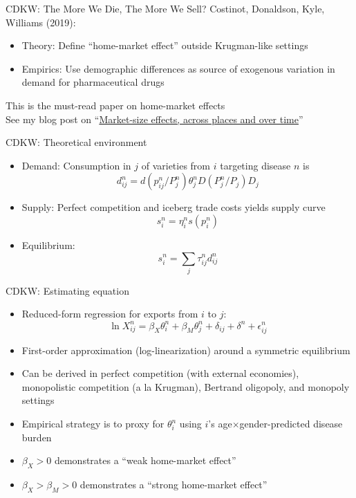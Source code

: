 \documentclass[10pt,notes=hide]{beamer}
\begin{document}
\begin{frame}{CDKW: The More We Die, The More We Sell?}
Costinot, Donaldson, Kyle, Williams (2019):
\begin{itemize}
	\item Theory: Define ``home-market effect'' outside Krugman-like settings
	\item Empirics: Use demographic differences as source of exogenous variation in demand for pharmaceutical drugs
\end{itemize}
This is the must-read paper on home-market effects\\
\vspace{5mm}
\footnotesize{See my blog post on ``\href{https://tradediversion.net/2019/09/23/market-size-effects-across-places-and-over-time/}{Market-size effects, across places and over time}''}
\end{frame}
\begin{frame}{CDKW: Theoretical environment}
\begin{itemize}
	\item Demand: Consumption in $j$ of varieties from $i$ targeting disease $n$ is
	\begin{equation*}d_{ij}^n = d(p_{ij}^n/P_j^n) \theta_j^n D(P_j^n/P_j) D_j \end{equation*}
	\item Supply: Perfect competition and iceberg trade costs yields supply curve
	\begin{equation*} s_i^n = \eta_i^n s(p_i^n)\end{equation*}
	\item Equilibrium: 
	\begin{equation*} s_i^n = \sum_j \tau_{ij}^n d_{ij}^n \end{equation*}
\end{itemize}
\end{frame}
\begin{frame}{CDKW: Estimating equation}
\begin{itemize}
	\item Reduced-form regression for exports from $i$ to $j$:
	\begin{equation*}
		\ln X_{ij}^n = \beta_X \theta_i^n + \beta_M \theta_j^n +  \delta_{ij} + \delta^n + \epsilon_{ij}^n
	\end{equation*}
 	\item First-order approximation (log-linearization) around a symmetric equilibrium
 	\item Can be derived in perfect competition (with external economies), monopolistic competition (a la Krugman), Bertrand oligopoly, and monopoly settings
 	\item Empirical strategy is to proxy for $\theta_i^n$ using $i$'s age$\times$gender-predicted disease burden
 	\item $\beta_X > 0$ demonstrates a ``weak home-market effect''
 	\item $\beta_X > \beta_M > 0$ demonstrates a ``strong home-market effect''
\end{itemize}
\end{frame}
\end{document}
